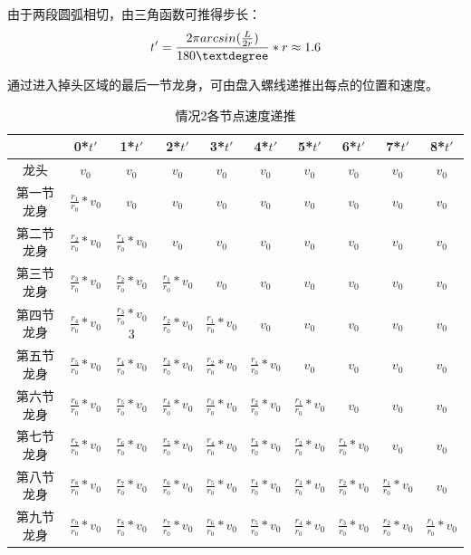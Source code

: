 \documentclass[withoutpreface,bwprint]{cumcmthesis}
\begin{document}
由于两段圆弧相切，由三角函数可推得步长：$$t' = \frac{2\pi arcsin(\frac{L}{2r})}{180\textdegree}*r \approx 1.6$$

通过进入掉头区域的最后一节龙身，可由盘入螺线递推出每点的位置和速度。
\begin{table}[h]
	\centering
	\begin{tabular}{|c|c|c|c|c|c|c|c|c|c|}
		\hline
		 & 0*$t'$ & 1*$t'$ & 2*$t'$ & 3*$t'$ & 4*$t'$ & 5*$t'$ & 6*$t'$ & 7*$t'$ & 8*$t'$ \\ \hline
	    龙头 & $v_0$ & $v_0$  &$v_0$ & $v_0$ & $v_0$ & $v_0$ & $v_0$ & $v_0$ & $v_0$ \\ \hline
		第一节龙身& $\frac{r_1}{r_0}*v_0$ & $v_0$ & $v_0$ & $v_0$ & $v_0$ & $v_0$ & $v_0$ & $v_0$ & $v_0$ \\ \hline
		第二节龙身 & $\frac{r_2}{r_0}*v_0$ & $\frac{r_1}{r_0}*v_0$ & $v_0$ & $v_0$ & $v_0$ & $v_0$ &$v_0$ & $v_0$ & $v_0$ \\ \hline
		第三节龙身 & $\frac{r_3}{r_0}*v_0$ & $\frac{r_2}{r_0}*v_0$ & $\frac{r_1}{r_0}*v_0$ & $v_0$ & $v_0$ & $v_0$ & $v_0$ & $v_0$ & $v_0$ \\ \hline
		第四节龙身 & $\frac{r_4}{r_0}*v_0$ & $\frac{r_3}{r_0}*v_0$3 & $\frac{r_2}{r_0}*v_0$ & $\frac{r_1}{r_0}*v_0$ & $v_0$ & $v_0$& $v_0$ & $v_0$ & $v_0$ \\ \hline
		第五节龙身 & $\frac{r_5}{r_0}*v_0$ & $\frac{r_4}{r_0}*v_0$ & $\frac{r_3}{r_0}*v_0$ & $\frac{r_2}{r_0}*v_0$ & $\frac{r_1}{r_0}*v_0$ & $v_0$ & $v_0$ & $v_0$ & $v_0$ \\ \hline
		第六节龙身 & $\frac{r_6}{r_0}*v_0$ & $\frac{r_5}{r_0}*v_0$ & $\frac{r_4}{r_0}*v_0$ & $\frac{r_3}{r_0}*v_0$ & $\frac{r_2}{r_0}*v_0$ & $\frac{r_1}{r_0}*v_0$ & $v_0$ & $v_0$ & $v_0$ \\ \hline
		第七节龙身 & $\frac{r_7}{r_0}*v_0$ & $\frac{r_6}{r_0}*v_0$ & $\frac{r_5}{r_0}*v_0$ & $\frac{r_4}{r_0}*v_0$ & $\frac{r_3}{r_0}*v_0$ & $\frac{r_2}{r_0}*v_0$ & $\frac{r_1}{r_0}*v_0$ & $v_0$ & $v_0$ \\ \hline
		第八节龙身 & $\frac{r_8}{r_0}*v_0$ & $\frac{r_7}{r_0}*v_0$ & $\frac{r_6}{r_0}*v_0$ & $\frac{r_5}{r_0}*v_0$ & $\frac{r_4}{r_0}*v_0$ & $\frac{r_3}{r_0}*v_0$ & $\frac{r_2}{r_0}*v_0$ & $\frac{r_1}{r_0}*v_0$ & $v_0$ \\ \hline
		第九节龙身 & $\frac{r_9}{r_0}*v_0$ & $\frac{r_8}{r_0}*v_0$ & $\frac{r_7}{r_0}*v_0$& $\frac{r_6}{r_0}*v_0$& $\frac{r_5}{r_0}*v_0$ & $\frac{r_4}{r_0}*v_0$ & $\frac{r_3}{r_0}*v_0$ &$\frac{r_2}{r_0}*v_0$  & $\frac{r_1}{r_0}*v_0$ \\ \hline
	\end{tabular}
	\caption{情况2各节点速度递推}
	\label{tab:n1}
\end{table}
\end{document}
